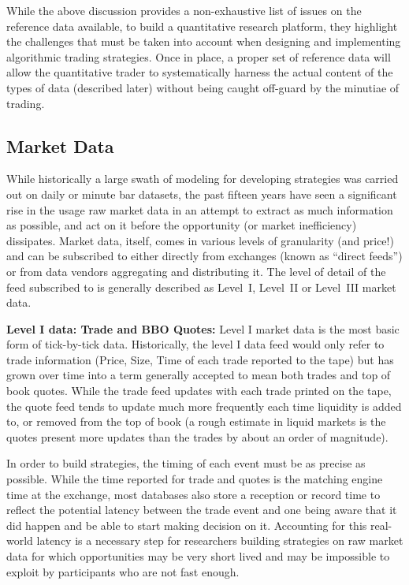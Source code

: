 While the above discussion provides a non-exhaustive list of issues on the reference data available, to build a quantitative research platform, they highlight the challenges that must be taken into account when designing and implementing algorithmic trading strategies. Once in place, a proper set of reference data will allow the quantitative trader to systematically harness the actual content of the types of data (described later) without being caught off-guard by the minutiae of trading.


\subsection{Market Data \label{subsec:marketdata} }

While historically a large swath of modeling for developing strategies was carried out on daily or minute bar datasets, the past fifteen years have seen a significant rise in the usage raw market data in an attempt to extract as much information as possible, and act on it before the opportunity (or market inefficiency) dissipates. Market data, itself, comes in various levels of granularity (and price!) and can be subscribed to either directly from exchanges (known as ``direct feeds'') or from data vendors aggregating and distributing it. The level of detail of the feed subscribed to is generally described as Level~I, Level~II or Level~III market data.\twomedskip


\noindent\textbf{Level I data: Trade and BBO Quotes:} Level I market data is the most basic form of tick-by-tick data. Historically, the level I data feed would only refer to trade information (Price, Size, Time of each trade reported to the tape) but has grown over time into a term generally accepted to mean both trades and top of book quotes. While the trade feed updates with each trade printed on the tape, the quote feed tends to update much more frequently each time liquidity is added to, or removed from the top of book (a rough estimate in liquid markets is the quotes present more updates than the trades by about an order of magnitude). 


In order to build strategies, the timing of each event must be as precise as possible. While the time reported for trade and quotes is the matching engine time at the exchange, most databases also store a reception or record time to reflect the potential latency between the trade event and one being aware that it did happen and be able to start making decision on it. Accounting for this real-world latency is a necessary step for researchers building strategies on raw market data for which opportunities may be very short lived and may be impossible to exploit by participants who are not fast enough.


